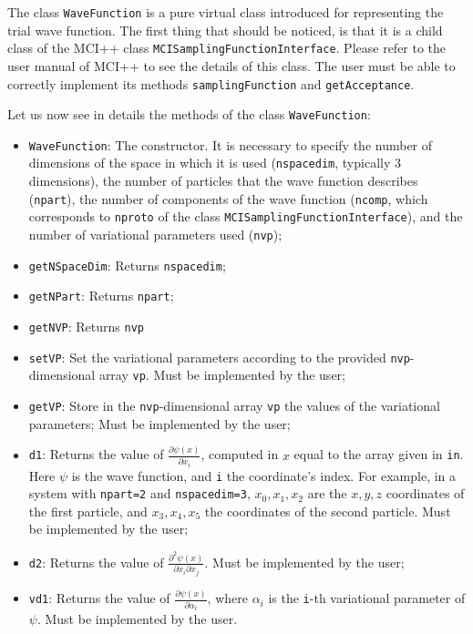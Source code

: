 \documentclass[11pt,a4paper,twoside]{article}
\begin{document}
The class \verb+WaveFunction+ is a pure virtual class introduced for representing the trial wave function.
The first thing that should be noticed, is that it is a child class of the MCI++ class \verb+MCISamplingFunctionInterface+.
Please refer to the user manual of MCI++ to see the details of this class.
The user must be able to correctly implement its methods \verb+samplingFunction+ and \verb+getAcceptance+.

Let us now see in details the methods of the class \verb+WaveFunction+:
\begin{itemize}
   \item \verb+WaveFunction+: The constructor. It is necessary to specify the number of dimensions of the space in which it is used (\verb+nspacedim+, typically $3$ dimensions), the number of particles that the wave function describes (\verb+npart+), the number of components of the wave function (\verb+ncomp+, which corresponds to \verb+nproto+ of the class \verb+MCISamplingFunctionInterface+), and the number of variational parameters used (\verb+nvp+);
   \item \verb+getNSpaceDim+: Returns \verb+nspacedim+;
   \item \verb+getNPart+: Returns \verb+npart+;
   \item \verb+getNVP+: Returns \verb+nvp+
   \item \verb+setVP+: Set the variational parameters according to the provided \verb+nvp+-dimensional array \verb+vp+. Must be implemented by the user;
   \item \verb+getVP+: Store in the \verb+nvp+-dimensional array \verb+vp+ the values of the variational parameters; Must be implemented by the user;
   \item \verb+d1+: Returns the value of $\frac{\partial \psi(x)}{\partial x_{i}}$, computed in $x$ equal to the array given in \verb+in+. Here $\psi$ is the wave function, and \verb+i+ the coordinate's index. For example, in a system with \verb+npart=2+ and \verb+nspacedim=3+, $x_0, x_1, x_2$ are the $x,y,z$ coordinates of the first particle, and $x_3,x_4,x_5$ the coordinates of the second particle. Must be implemented by the user;
   \item \verb+d2+: Returns the value of $\frac{\partial^2 \psi(x)}{\partial x_{i} \partial x_j}$. Must be implemented by the user;
   \item \verb+vd1+: Returns the value of $\frac{\partial \psi(x)}{\partial \alpha_{i}}$, where $\alpha_i$ is the \verb+i+-th variational parameter of $\psi$. Must be implemented by the user.
\end{itemize}
\end{document}
